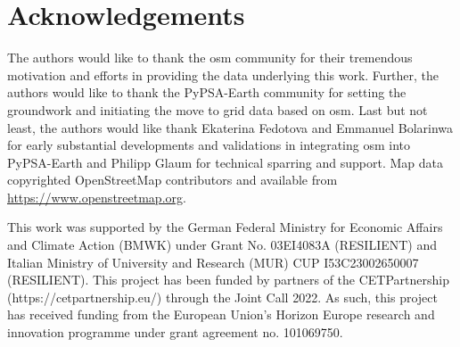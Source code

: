 \documentclass[fleqn,10pt]{wlscirep}
\begin{document}



\section*{Acknowledgements} %
The authors would like to thank the \gls{osm} community for their tremendous motivation and efforts in providing the data underlying this work. Further, the authors would like to thank the PyPSA-Earth community for setting the groundwork and initiating the move to grid data based on \gls{osm}. Last but not least, the authors would like thank Ekaterina Fedotova and Emmanuel Bolarinwa for early substantial developments and validations in integrating \acrshort{osm} into PyPSA-Earth and Philipp Glaum for technical sparring and support. Map data copyrighted OpenStreetMap contributors and available from \href{https://www.openstreetmap.org}{https://www.openstreetmap.org}. 

This work was supported by the German Federal Ministry for Economic Affairs and Climate Action (BMWK) under Grant No. 03EI4083A (RESILIENT) and Italian Ministry of University and Research (MUR) CUP I53C23002650007 (RESILIENT). This project has been funded by partners of the CETPartnership (https://cetpartnership.eu/) through the Joint Call 2022. As such, this project has received funding from the European Union's Horizon Europe research and innovation programme under grant agreement no. 101069750.
\end{document}
